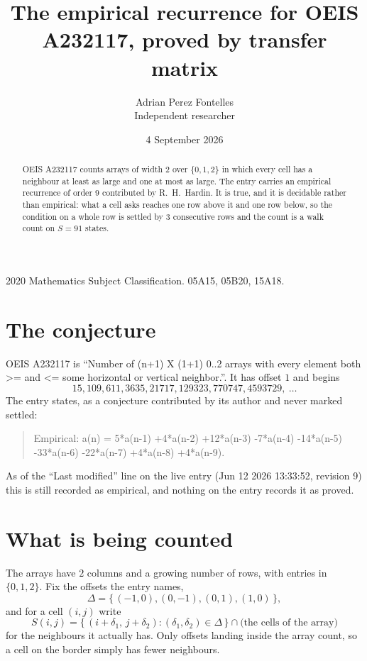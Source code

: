 \documentclass[11pt,a4paper]{article}
\title{The empirical recurrence for OEIS A232117, proved by transfer matrix}
\author{Adrian Perez Fontelles\\ \small Independent researcher}
\date{4 September 2026}
\theoremstyle{plain}
\theoremstyle{definition}
\begin{document}
\maketitle

\begin{abstract}
OEIS A232117 counts arrays of width $2$ over $\{0,1,2\}$ in which every cell has a neighbour at least as large and one at most as large. The entry carries an
empirical recurrence of order $9$ contributed by R.~H.~Hardin. It is true, and it is
decidable rather than empirical: what a cell asks reaches one row above it and one row below, so the
condition on a whole row is settled by $3$ consecutive rows and the count is a walk
count on $S=91$ states.
\end{abstract}

\noindent\small 2020 Mathematics Subject Classification. 05A15, 05B20, 15A18.\normalsize

\section{The conjecture}

OEIS A232117 is ``Number of (n+1) X (1+1) 0..2 arrays with every element both >= and <= some horizontal or vertical neighbor.''. It has offset $1$ and begins
\[
15, 109, 611, 3635, 21717, 129323, 770747, 4593729,\ \dots
\]
The entry states, as a conjecture contributed by its author and never marked settled:
\begin{quote}
Empirical: a(n) = 5*a(n-1) +4*a(n-2) +12*a(n-3) -7*a(n-4) -14*a(n-5) -33*a(n-6) -22*a(n-7) +4*a(n-8) +4*a(n-9).
\end{quote}
As of the ``Last modified'' line on the live entry (Jun 12 2026 13:33:52, revision 9) this is still
recorded as empirical, and nothing on the entry records it as proved.

\section{What is being counted}

The arrays have $2$ columns and a growing number of rows, with entries in $\{0,1,2\}$. Fix the
offsets the entry names,
\[
\Delta=\{\,(-1,0), (0,-1), (0,1), (1,0)\,\},
\]
and for a cell $(i,j)$ write
\[
S(i,j)=\{\,(i+\delta_1,\,j+\delta_2) : (\delta_1,\delta_2)\in\Delta\,\}\cap
\text{(the cells of the array)}
\]
for the neighbours it actually has. Only offsets landing inside the array count, so a cell on
the border simply has fewer neighbours.
\end{document}
